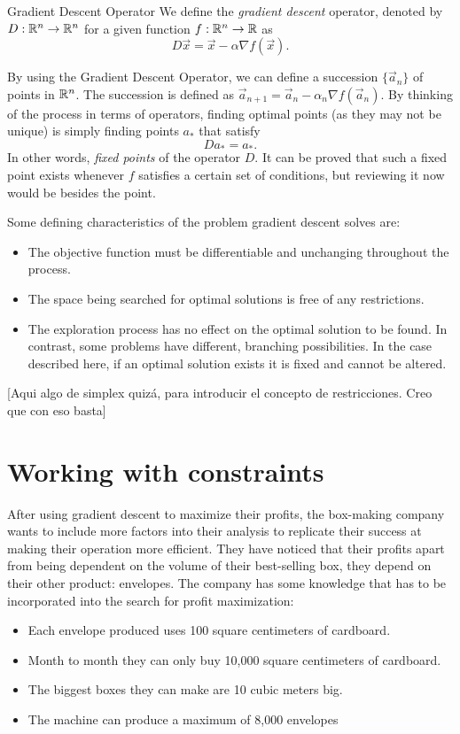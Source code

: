 \begin{dfn}{Gradient Descent Operator}{}
    We define the \emph{gradient descent} operator, denoted by $D: \mathbb{R}^{n} \to
    \mathbb{R}^{n}$ for a given function $f: \mathbb{R}^{n} \to \mathbb{R}$ as
    \[
        D \vec{x} = \vec{x} - \alpha \nabla f(\vec{x}).
    \]
\end{dfn}

By using the Gradient Descent Operator, we can define a succession
$\{\vec{a}_n\}$ of points in $\mathbb{R}^{n}$. The succession is defined as
$\vec{a}_{n+1} = \vec{a}_n - \alpha_n \nabla f(\vec{a}_n)$. By thinking of the
process in terms of operators, finding optimal points (as they may not be
unique) is simply finding points $a_*$ that satisfy
\[
    D a_* = a_*.
\]
In other words, \emph{fixed points} of the operator $D$. It can be proved that
such a fixed point exists whenever $f$ satisfies a certain set of conditions,
but reviewing it now would be besides the point. 

Some defining characteristics of the problem gradient descent solves are:
\begin{itemize}
    \item The objective function must be differentiable and unchanging
        throughout the process.
    \item The space being searched for optimal solutions is free of any
        restrictions.
    \item The exploration process has no effect on the optimal solution to be
        found. In contrast, some problems have different, branching possibilities.
        In the case described here, if an optimal solution exists it is fixed and
        cannot be altered.
\end{itemize}

[Aqui algo de simplex quizá, para introducir el concepto de restricciones. Creo
que con eso basta]

\section{Working with constraints}

After using gradient descent to maximize their profits, the box-making company
wants to include more factors into their analysis to replicate their success at
making their operation more efficient. They have noticed that their profits
apart from being dependent on the volume of their best-selling box, they depend
on their other product: envelopes. The company has some knowledge that has to
be incorporated into the search for profit maximization:
\begin{itemize}
    \item Each envelope produced uses 100 square centimeters of cardboard.
    \item Month to month they can only buy 10,000 square centimeters of cardboard.
    \item The biggest boxes they can make are 10 cubic meters big.
    \item The machine can produce a maximum of 8,000 envelopes
\end{itemize}


